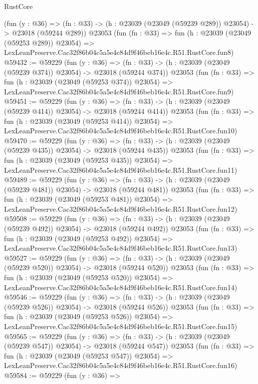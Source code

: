 \begin{lexlean}{RustCore}
\begin{coremodule}
    (fun (y : @36) =>
    (fn : @33) -> (h : @23039 (@23049 (@59239 @289)) @23054) -> @23018 (@59244 @289))
    @23053
    (fun (fn : @33) =>
    fun (h : @23039 (@23049 (@59253 @289)) @23054) =>
    LexLeanPreserve.Cac32f86b04c5a5e4c84d9f46beb16e4c.R51.RustCore.fun8)
@59432 := @59229
    (fun (y : @36) =>
    (fn : @33) -> (h : @23039 (@23049 (@59239 @374)) @23054) -> @23018 (@59244 @374))
    @23053
    (fun (fn : @33) =>
    fun (h : @23039 (@23049 (@59253 @374)) @23054) =>
    LexLeanPreserve.Cac32f86b04c5a5e4c84d9f46beb16e4c.R51.RustCore.fun9)
@59451 := @59229
    (fun (y : @36) =>
    (fn : @33) -> (h : @23039 (@23049 (@59239 @414)) @23054) -> @23018 (@59244 @414))
    @23053
    (fun (fn : @33) =>
    fun (h : @23039 (@23049 (@59253 @414)) @23054) =>
    LexLeanPreserve.Cac32f86b04c5a5e4c84d9f46beb16e4c.R51.RustCore.fun10)
@59470 := @59229
    (fun (y : @36) =>
    (fn : @33) -> (h : @23039 (@23049 (@59239 @435)) @23054) -> @23018 (@59244 @435))
    @23053
    (fun (fn : @33) =>
    fun (h : @23039 (@23049 (@59253 @435)) @23054) =>
    LexLeanPreserve.Cac32f86b04c5a5e4c84d9f46beb16e4c.R51.RustCore.fun11)
@59489 := @59229
    (fun (y : @36) =>
    (fn : @33) -> (h : @23039 (@23049 (@59239 @481)) @23054) -> @23018 (@59244 @481))
    @23053
    (fun (fn : @33) =>
    fun (h : @23039 (@23049 (@59253 @481)) @23054) =>
    LexLeanPreserve.Cac32f86b04c5a5e4c84d9f46beb16e4c.R51.RustCore.fun12)
@59508 := @59229
    (fun (y : @36) =>
    (fn : @33) -> (h : @23039 (@23049 (@59239 @492)) @23054) -> @23018 (@59244 @492))
    @23053
    (fun (fn : @33) =>
    fun (h : @23039 (@23049 (@59253 @492)) @23054) =>
    LexLeanPreserve.Cac32f86b04c5a5e4c84d9f46beb16e4c.R51.RustCore.fun13)
@59527 := @59229
    (fun (y : @36) =>
    (fn : @33) -> (h : @23039 (@23049 (@59239 @520)) @23054) -> @23018 (@59244 @520))
    @23053
    (fun (fn : @33) =>
    fun (h : @23039 (@23049 (@59253 @520)) @23054) =>
    LexLeanPreserve.Cac32f86b04c5a5e4c84d9f46beb16e4c.R51.RustCore.fun14)
@59546 := @59229
    (fun (y : @36) =>
    (fn : @33) -> (h : @23039 (@23049 (@59239 @526)) @23054) -> @23018 (@59244 @526))
    @23053
    (fun (fn : @33) =>
    fun (h : @23039 (@23049 (@59253 @526)) @23054) =>
    LexLeanPreserve.Cac32f86b04c5a5e4c84d9f46beb16e4c.R51.RustCore.fun15)
@59565 := @59229
    (fun (y : @36) =>
    (fn : @33) -> (h : @23039 (@23049 (@59239 @547)) @23054) -> @23018 (@59244 @547))
    @23053
    (fun (fn : @33) =>
    fun (h : @23039 (@23049 (@59253 @547)) @23054) =>
    LexLeanPreserve.Cac32f86b04c5a5e4c84d9f46beb16e4c.R51.RustCore.fun16)
@59584 := @59229
    (fun (y : @36) =>

\end{coremodule}
\end{lexlean}

